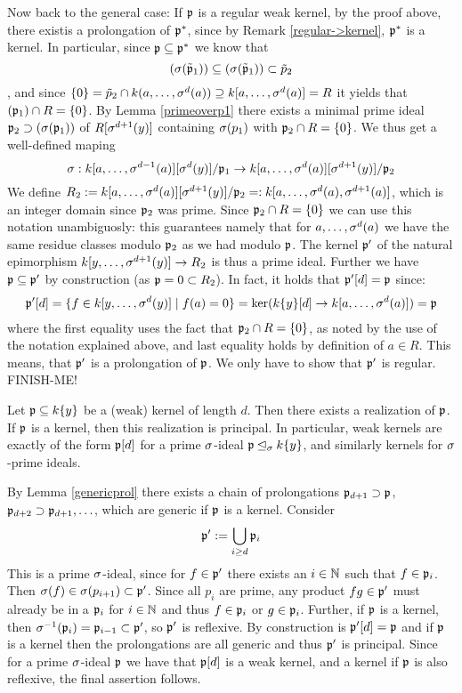 \begin{prop}
\begin{bew}
Now back to the general case: If $\mathfrak{p}$ is a regular weak kernel, by the proof above, there existis a prolongation of $\mathfrak{p}^*$, since by Remark \ref{regular->kernel}, $\mathfrak{p}^*$ is a kernel. 
In particular, since $\mathfrak{p} \subseteq \mathfrak{p}^*$ we know that \[ (\sigma(\tilde {\mathfrak{p}}_1)) \subseteq (\sigma(\tilde {\mathfrak{p}}_1)) \subset \tilde p_2 \],
and since $\{0\} = \tilde p_2 \cap k(a,\ldots,\sigma^d(a)) \supseteq k[a,\ldots,\sigma^d(a)] = R$ it yields that $(\mathfrak{p}_1) \cap R = \{0\}$.
By Lemma \ref{primeoverp1} there exists a minimal prime ideal $\mathfrak{p}_2 \supset (\sigma(\mathfrak{p}_1))$ of $R[\sigma^{d+1}(y)]$ containing $\sigma(p_1)$ with $\mathfrak{p}_2 \cap R = \{0\}$. 
We thus get a well-defined maping
\[ \sigma: k[a,\ldots,\sigma^{d-1}(a)][\sigma^d(y)]/\mathfrak{p}_1 \rightarrow k[a,\ldots, \sigma^d(a)][\sigma^{d+1}(y)]/\mathfrak{p}_2 \]
We define $R_2:= k[a,\ldots,\sigma^d(a)][\sigma^{d+1}(y)]/\mathfrak{p}_2 =: k[a,\ldots,\sigma^d(a),\sigma^{d+1}(a)]$, which is an integer domain since $\mathfrak{p}_2$ was prime. Since $\mathfrak{p}_2 \cap R = \{0\}$ we can use this notation unambiguosly:
this guarantees namely that for $a, \ldots, \sigma^d(a)$ we have the same residue classes modulo $\mathfrak{p}_2$ as we had modulo $\mathfrak{p}$.
The kernel $\mathfrak{p}'$ of the natural epimorphism $k[y,\ldots,\sigma^{d+1}(y)] \rightarrow R_2$ is thus a prime ideal.
Further we have $\mathfrak{p} \subseteq \mathfrak{p}'$ by construction (as $\mathfrak{p} = 0 \subset R_2$). In fact, it holds that $\mathfrak{p}'[d] = \mathfrak{p}$ since: 
\begin{align*}
\mathfrak{p}'[d] = \{ f \in k[y,\ldots,\sigma^d(y)] \mid f(a) = 0 \} = \ker( k\{y\}[d] \rightarrow k[a,\ldots,\sigma^{d}(a)]) = \mathfrak{p}
\end{align*}
where the first equality uses the fact that $\mathfrak{p}_2 \cap R = \{0\}$, as noted by the use of the notation explained above, and last equality holds by definition of $a \in R$. This means, that $\mathfrak{p}'$ is a prolongation of $\mathfrak{p}$. 
We only have to show that $\mathfrak{p}'$ is regular. FINISH-ME!
\end{bew}
\end{prop}


\begin{prop}
Let $\mathfrak{p} \subseteq k\{y\}$ be a (weak) kernel of length $d$. Then there exists a realization of $\mathfrak{p}$. If $\mathfrak{p}$ is a kernel, then this realization is principal.
In particular, weak kernels are exactly of the form $\mathfrak{p}[d]$ for a prime $\sigma$-ideal $\mathfrak{p} \unlhd_{\sigma} k\{y\}$, and similarly kernels for $\sigma$-prime ideals.
\begin{bew}
By Lemma \ref{genericprol} there exists a chain of prolongations $\mathfrak{p}_{d+1} \supset \mathfrak{p}$, $\mathfrak{p}_{d+2} \supset \mathfrak{p}_{d+1}, \ldots$, which are generic if $\mathfrak{p}$ is a kernel.
Consider \[ \mathfrak{p}':= \bigcup_{i \geq d} \mathfrak{p}_i \]
This is a prime $\sigma$-ideal, since for $f \in \mathfrak{p}'$ there exists an $i \in \mathbb{N}$ such that $f \in \mathfrak{p}_i$. Then $\sigma(f) \in \sigma(p_{i+1}) \subset \mathfrak{p}'$.
Since all $p_i$ are prime, any product $fg \in \mathfrak{p}'$ must already be in a $\mathfrak{p}_i$ for $i \in \mathbb{N}$ and thus $f \in \mathfrak{p}_i$ or $g \in \mathfrak{p}_i$. Further,
 if $\mathfrak{p}$ is a kernel, then $\sigma^{-1}(\mathfrak{p}_i) = \mathfrak{p}_{i-1} \subset \mathfrak{p}'$, so $\mathfrak{p}'$ is reflexive. By construction is $\mathfrak{p}'[d] = \mathfrak{p}$ and if $\mathfrak{p}$ is a kernel then the
 prolongations are all generic and thus $\mathfrak{p}'$ is principal. Since for a prime $\sigma$-ideal $\mathfrak{p}$ we have that $\mathfrak{p}[d]$ is a weak kernel, and a kernel if $\mathfrak{p}$ is also reflexive, 
the final assertion follows.
\end{bew}
\end{prop}


